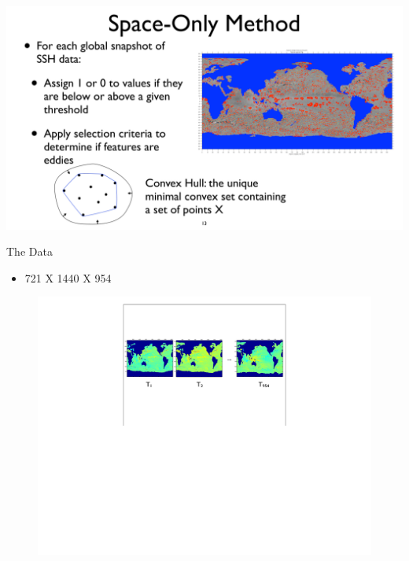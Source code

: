 \documentclass[mathserif]{beamer}
\begin{document}
\begin{frame}
\includegraphics[scale=.32]{figures/globalEddies.pdf}
\end{frame}

\begin{frame}{The Data}
\begin{itemize}
\item 721 X 1440 X 954
\end{itemize}
\begin{figure}
\centering
\includegraphics[scale=.8]{figures/sshMaps.pdf}
\end{figure}
\end{frame}
\end{document}
